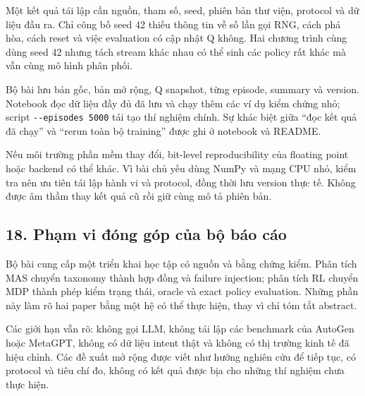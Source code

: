 Một kết quả tái lập cần nguồn, tham số, seed, phiên bản thư viện,
protocol và dữ liệu đầu ra. Chỉ công bố seed 42 thiếu thông tin về số
lần gọi RNG, cách phá hòa, cách reset và việc evaluation có cập nhật Q
không. Hai chương trình cùng dùng seed 42 nhưng tách stream khác nhau có
thể sinh các policy rất khác mà vẫn cùng mô hình phân phối.

Bộ bài lưu bản gốc, bản mở rộng, Q snapshot, từng episode, summary và
version. Notebook đọc dữ liệu đầy đủ đã lưu và chạy thêm các ví dụ kiểm
chứng nhỏ; script \passthrough{\lstinline!--episodes 5000!} tái tạo thí
nghiệm chính. Sự khác biệt giữa ``đọc kết quả đã chạy'' và ``rerun toàn
bộ training'' được ghi ở notebook và README.

Nếu môi trường phần mềm thay đổi, bit-level reproducibility của floating
point hoặc backend có thể khác. Vì bài chủ yếu dùng NumPy và mạng CPU
nhỏ, kiểm tra nên ưu tiên tái lập hành vi và protocol, đồng thời lưu
version thực tế. Không được âm thầm thay kết quả cũ rồi giữ cùng mô tả
phiên bản.

\subsection{18. Phạm vi đóng góp của bộ báo
cáo}\label{phux1ea1m-vi-ux111uxf3ng-guxf3p-cux1ee7a-bux1ed9-buxe1o-cuxe1o}

Bộ bài cung cấp một triển khai học tập có nguồn và bằng chứng kiểm. Phân
tích MAS chuyển taxonomy thành hợp đồng và failure injection; phân tích
RL chuyển MDP thành phép kiểm trạng thái, oracle và exact policy
evaluation. Những phần này làm rõ hai paper bằng một hệ có thể thực
hiện, thay vì chỉ tóm tắt abstract.

Các giới hạn vẫn rõ: không gọi LLM, không tái lập các benchmark của
AutoGen hoặc MetaGPT, không có dữ liệu intent thật và không có thị
trường kinh tế đã hiệu chỉnh. Các đề xuất mở rộng được viết như hướng
nghiên cứu để tiếp tục, có protocol và tiêu chí đo, không có kết quả
được bịa cho những thí nghiệm chưa thực hiện.
